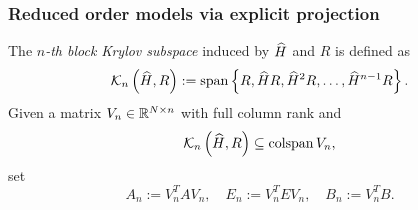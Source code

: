 \documentclass[letterpaper]{article}
\theoremstyle{remark}
\begin{document}
\begin{description}
\begin{comment}
   This is known as the \emph{Hessenberg formulation} of the reduced model,
   although $\A_n$ is actually only of Hessenberg form in the SISO ($\nin=1$) case. 
   It satisfies the Pad\'{e}-type property \eqref{eq:pade} with $q(n)=n$.
   Eigenvalues $\reig$ of $\A_n$ are called \emph{Ritz values}, 
   and they approximate eigenvalues $\lambda$
   of $\A$, which, via \eqref{eq:pole_eig} are related to the poles of the model.
   Given $w\in\C^n$ ($with \|w\|=1$) and $\reig\in\C$ that satisfy $H_nw=\reig w$,
   it follows from \eqref{eq:arnoldi_decomp} that 
   \[
   \A V_nw = \reig V_nw + \eta v_{n+1} e_n^{T} w,
   \]

   which provides us with a simple means to determine 
   how accurately $\reig$ approximates an eigenvalue of $\A$.  Denoting 
   $y := V_nw$ as the Ritz-vector of $\A$ associated with $\reig$, the
   \emph{residual} of $\reig$ is  
   \begin{align*}
   \nrm{}{\A y-\reig y} &= \nrm{}{\eta(e_n^{T} w)v_{n+1}}\nonumber\\
   &= \vert\eta w_{n}\vert,
	\end{align*}
   where $w_{n}$ denotes the last ($n$-th) entry of $w$.  Orthogonality of $V_n$ 
   implies
   that $\nrm{}{\lambda y}=\vert\reig\vert$, and thus we may use the 
   \emph{relative residual}
   \begin{equation*}
   \frac{\nrm{}{\A y-\reig y}}{\nrm{}{\reig y}} 
   = \left\vert\frac{\eta w_{n}}{\reig}\right\vert
   \end{equation*}
   as a convergence criterion for the ritz value $\reig$.  
   Since $\reig\rightarrow\lambda$ for 
   some eigenvalue $\lambda$ of $\A$, by \eqref{eq:pole_eig}, 
   \[
   s_0 + \frac{1}{\reig} \rightarrow \mu
   \]
   for some pole $\mu$ of the unreduced model, ideally a dominant one. 

  \smallskip 
   The problem with formulation \eqref{eq:rm_hess} is that the eigenvalues $\reig$
   of $\A_n$ do 
	not necessarily satisfy $\mathrm{Re}\,\reig\leq 0$. The transfer function 
	\eqref{eq:rm_hess} is not positive real and thus the reduced model it 
	represents 
	 does not preserve stability nor passivity of the original model.
\end{comment}

  \subsubsection{Reduced order models via explicit projection}
 The \emph{$n$-th block Krylov subspace} induced by $\widehat{H}$ and $R$
 is defined as  
 \[
  \mathcal{K}_{n}\left({\widehat{H}},{R} \right):= \mathrm{span}\left\{R,\widehat{H} R,\widehat{H}^2R,\ldots,\widehat{H}^{n-1}R\right\}.
 \]
 Given a matrix 
 $V_n\in\mathbb{R}^{N\times n}$ with full column rank and 
 \begin{equation}
 \mathcal{K}_{n}\left({\widehat{H}},{R} \right) \subseteq \mathrm{colspan}\, V_n,
 \label{eq:looser}
 \end{equation}
 set
 \begin{equation}
 A_n := V_n^TAV_n, \quad E_n := V_n^TEV_n, \quad B_n := V_n^TB.
 \label{eq:projections}
 \end{equation}


\end{description}
\end{document}
